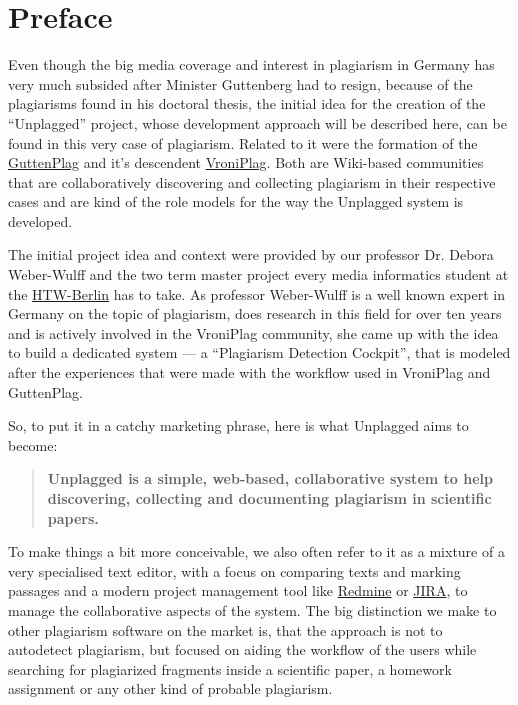 \chapter{Preface}

Even though the big media coverage and interest in plagiarism in Germany has very much subsided\citep{Google2012} 
after Minister Guttenberg had to resign, because of the plagiarisms found in his doctoral thesis, the initial idea
for the 
creation of the \enquote{Unplagged} project, whose development approach will be described here, can be found in this 
very case of plagiarism. Related to it were the formation of the
\href{http://de.guttenplag.wikia.com/wiki/GuttenPlag\_Wiki}{GuttenPlag} and it's descendent 
\href{http://de.vroniplag.wikia.com/wiki/Home}{VroniPlag}. Both are Wiki-based communities that are collaboratively 
discovering and collecting plagiarism in their respective cases and are kind of the role models for the way the
Unplagged system is developed.

The initial project idea and context were provided by our professor Dr. Debora Weber-Wulff and the two term master project
every media informatics student at the \href{http://htw-berlin.de/}{HTW-Berlin} has to take. As professor Weber-Wulff is 
a well known expert in Germany on the
topic of plagiarism,
does research in this field for over ten years\citep{Spiegel-Online2011} and is actively involved in the VroniPlag
community, she came up with the idea to build a dedicated system --- a \enquote{Plagiarism Detection Cockpit}\citep{Weber-Wulff2011}, 
that is modeled after the experiences that were made
with the workflow used in VroniPlag and GuttenPlag.


So, to put it in a catchy marketing phrase, here is what Unplagged aims to become: 

\begin{quote}
\textbf{Unplagged is a simple, web-based, collaborative system to help discovering, collecting and 
documenting plagiarism in scientific papers.}
\end{quote}

To make things a bit more conceivable, we also often refer to it as a mixture of a very specialised text editor, with a focus on 
comparing texts and marking 
passages and a modern project management tool like \href{http://www.redmine.org/}{Redmine} or 
\href{http://www.atlassian.com/JIRA}{JIRA}, 
to manage the collaborative aspects of the system. The big distinction we make to other plagiarism software on the market is, 
that the approach is not to autodetect plagiarism, but focused on aiding the workflow of the users while  
searching for plagiarized
fragments inside a scientific paper, a homework assignment or any other kind of probable plagiarism.

